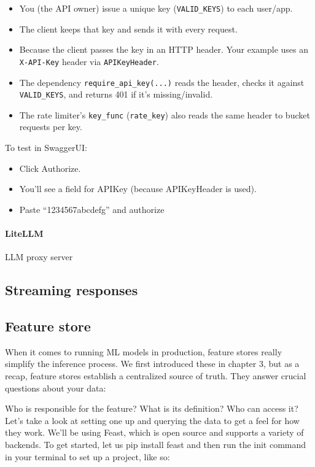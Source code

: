 \begin{itemize}
	\item You (the API owner) issue a unique key (\ie \texttt{VALID\_KEYS}) to each user/app.
	\item The client keeps that key and sends it with every request.
	\item Because the client passes the key in an HTTP header. Your example uses an \texttt{X-API-Key} header via \texttt{APIKeyHeader}.
	\item The dependency \texttt{require\_api\_key(...)} reads the header, checks it against \texttt{VALID\_KEYS}, and returns 401 if it's missing/invalid.
	\item The rate limiter's \texttt{key\_func} (\texttt{rate\_key}) also reads the same header to bucket requests per key.
\end{itemize}
To test in SwaggerUI:
\begin{itemize}
	\item Click Authorize.
	\item You'll see a field for APIKey (because APIKeyHeader is used).
	\item Paste ``1234567abcdefg'' and authorize
\end{itemize}

\paragraph{LiteLLM} LLM proxy server


\subsection{Streaming responses}

\subsection{Feature store}
When it comes to running ML models in production, feature stores really simplify the inference process. We first introduced these in chapter 3, but as a recap, feature stores establish a centralized source of truth. They answer crucial questions about your data:

Who is responsible for the feature? What is its definition? Who can access it? Let's take a look at setting one up and querying the data to get a feel for how they work. We'll be using Feast, which is open source and supports a variety of backends. To get started, let us pip install feast and then run the init command in your terminal to set up a project, like so:

